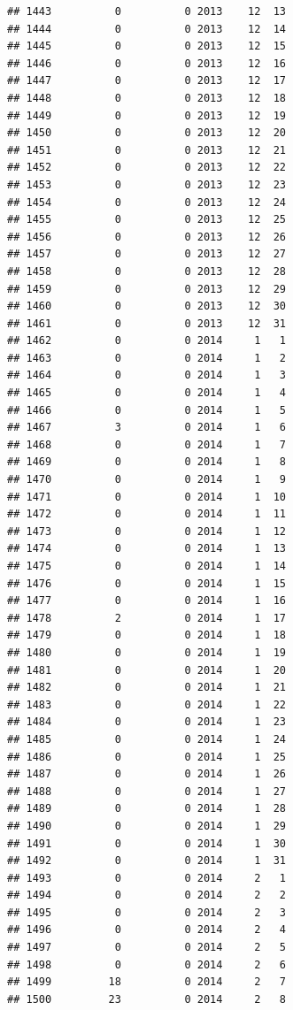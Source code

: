 \documentclass[
]{article}
\begin{document}
\begin{verbatim}
## 1443          0          0 2013    12  13
## 1444          0          0 2013    12  14
## 1445          0          0 2013    12  15
## 1446          0          0 2013    12  16
## 1447          0          0 2013    12  17
## 1448          0          0 2013    12  18
## 1449          0          0 2013    12  19
## 1450          0          0 2013    12  20
## 1451          0          0 2013    12  21
## 1452          0          0 2013    12  22
## 1453          0          0 2013    12  23
## 1454          0          0 2013    12  24
## 1455          0          0 2013    12  25
## 1456          0          0 2013    12  26
## 1457          0          0 2013    12  27
## 1458          0          0 2013    12  28
## 1459          0          0 2013    12  29
## 1460          0          0 2013    12  30
## 1461          0          0 2013    12  31
## 1462          0          0 2014     1   1
## 1463          0          0 2014     1   2
## 1464          0          0 2014     1   3
## 1465          0          0 2014     1   4
## 1466          0          0 2014     1   5
## 1467          3          0 2014     1   6
## 1468          0          0 2014     1   7
## 1469          0          0 2014     1   8
## 1470          0          0 2014     1   9
## 1471          0          0 2014     1  10
## 1472          0          0 2014     1  11
## 1473          0          0 2014     1  12
## 1474          0          0 2014     1  13
## 1475          0          0 2014     1  14
## 1476          0          0 2014     1  15
## 1477          0          0 2014     1  16
## 1478          2          0 2014     1  17
## 1479          0          0 2014     1  18
## 1480          0          0 2014     1  19
## 1481          0          0 2014     1  20
## 1482          0          0 2014     1  21
## 1483          0          0 2014     1  22
## 1484          0          0 2014     1  23
## 1485          0          0 2014     1  24
## 1486          0          0 2014     1  25
## 1487          0          0 2014     1  26
## 1488          0          0 2014     1  27
## 1489          0          0 2014     1  28
## 1490          0          0 2014     1  29
## 1491          0          0 2014     1  30
## 1492          0          0 2014     1  31
## 1493          0          0 2014     2   1
## 1494          0          0 2014     2   2
## 1495          0          0 2014     2   3
## 1496          0          0 2014     2   4
## 1497          0          0 2014     2   5
## 1498          0          0 2014     2   6
## 1499         18          0 2014     2   7
## 1500         23          0 2014     2   8

\end{verbatim}
\end{document}
